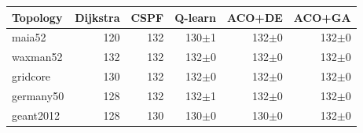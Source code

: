 \begin{tabular}{@{}lrrrrr@{}}
\toprule
Topology & Dijkstra & CSPF & Q-learn & ACO+DE & ACO+GA\\
\midrule
maia52 & 120 & 132 & 130$\pm$1 & 132$\pm$0 & 132$\pm$0\\
waxman52 & 132 & 132 & 132$\pm$0 & 132$\pm$0 & 132$\pm$0\\
gridcore & 130 & 132 & 132$\pm$0 & 132$\pm$0 & 132$\pm$0\\
germany50 & 128 & 132 & 132$\pm$1 & 132$\pm$0 & 132$\pm$0\\
geant2012 & 128 & 130 & 130$\pm$0 & 130$\pm$0 & 132$\pm$0\\
\bottomrule
\end{tabular}
